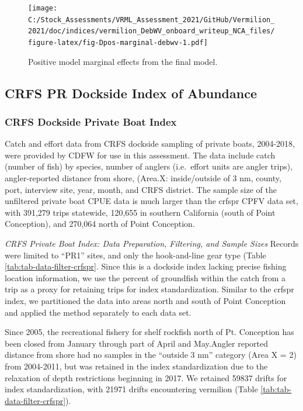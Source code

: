\documentclass[
  english,
  a4paper,
]{article}
\begin{document}
\begin{figure}
\centering
\texttt{[image: C:/Stock\_Assessments/VRML\_Assessment\_2021/GitHub/Vermilion\_2021/doc/indices/vermilion\_DebWV\_onboard\_writeup\_NCA\_files/figure-latex/fig-Dpos-marginal-debwv-1.pdf]}
\caption{\label{fig:fig-Dpos-marginal-debwv}Positive model marginal effects from the final model.}
\end{figure}

\clearpage

\hypertarget{pr-index}{%
\subsection{CRFS PR Dockside Index of Abundance}\label{pr-index}}

\hypertarget{crfs-dockside-private-boat-index}{%
\subsubsection{CRFS Dockside Private Boat Index}\label{crfs-dockside-private-boat-index}}

Catch and effort data from CRFS dockside sampling of private boats, 2004-2018,
were provided by CDFW for use in this assessment. The data include catch (number
of fish) by species, number of anglers (i.e.~effort units are angler trips),
angler-reported distance from shore, (Area.X: inside/outside of 3 nm, county, port,
interview site, year, month, and CRFS district. The sample size of the
unfiltered private boat CPUE data is much larger than the crfspr CPFV data set,
with 391,279 trips statewide, 120,655 in southern California (south
of Point Conception), and 270,064 north of Point Conception.

\emph{CRFS Private Boat Index: Data Preparation, Filtering, and Sample Sizes}
Records were limited to ``PR1'' sites, and only the hook-and-line gear type
(Table \ref{tab:tab-data-filter-crfspr}.
Since this is a dockside index lacking precise fishing location information, we
use the percent of groundfish within the catch from a trip as a proxy for retaining
trips for index standardization. Similar to the crfspr index, we partitioned the
data into areas north and south of Point Conception and applied the method
separately to each data set.

Since 2005, the recreational fishery for shelf rockfish north of Pt. Conception
has been closed from January through part of April and May.Angler reported distance
from shore had no samples in the ``outside 3 nm'' category (Area X = 2)
from 2004-2011, but was retained in the index standardization due to the relaxation
of depth restrictions beginning in 2017. We retained 59837 drifts for index standardization, with 21971 drifts encountering vermilion
(Table \ref{tab:tab-data-filter-crfspr}).
\end{document}
